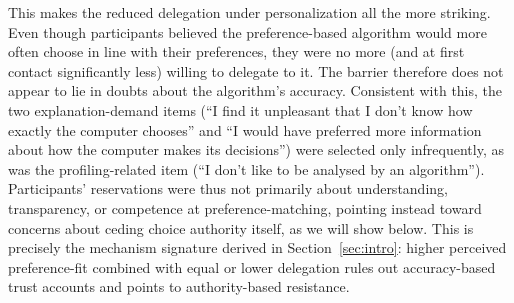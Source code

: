 \documentclass[a4paper, 12pt, fleqn]{article}
\theoremstyle{definition}
\begin{document}

This makes the reduced delegation under personalization all the more striking. Even though participants believed the preference-based algorithm would more often choose in line with their preferences, they were no more (and at first contact significantly less) willing to delegate to it. The barrier therefore does not appear to lie in doubts about the algorithm's accuracy. Consistent with this, the two explanation-demand items (``I find it unpleasant that I don't know how exactly the computer chooses'' and ``I would have preferred more information about how the computer makes its decisions'') were selected only infrequently, as was the profiling-related item (``I don't like to be analysed by an algorithm''). Participants' reservations were thus not primarily about understanding, transparency, or competence at preference-matching, pointing instead toward concerns about ceding choice authority itself, as we will show below. This is precisely the mechanism signature derived in Section~\ref{sec:intro}: higher perceived preference-fit combined with equal or lower delegation rules out accuracy-based trust accounts and points to authority-based resistance.
\end{document}
